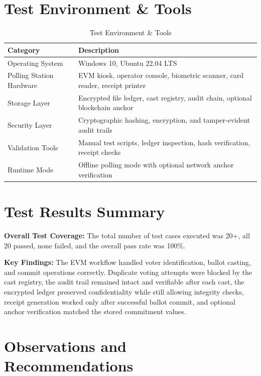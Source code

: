 \section{Test Environment \& Tools}

\begin{table}[htbp]
\centering
\caption{Test Environment \& Tools}
\begin{tabular}{p{}|p{}}
\toprule
\textbf{Category} & \textbf{Description} \\
\midrule
Operating System & Windows 10, Ubuntu 22.04 LTS \\
\midrule
Polling Station Hardware & EVM kiosk, operator console, biometric scanner, card reader, receipt printer \\
\midrule
Storage Layer & Encrypted file ledger, cast registry, audit chain, optional blockchain anchor \\
\midrule
Security Layer & Cryptographic hashing, encryption, and tamper-evident audit trails \\
\midrule
Validation Tools & Manual test scripts, ledger inspection, hash verification, receipt checks \\
\midrule
Runtime Mode & Offline polling mode with optional network anchor verification \\
\bottomrule
\end{tabular}
\end{table}

\section{Test Results Summary}

\textbf{Overall Test Coverage:}
The total number of test cases executed was 20+, all 20 passed, none failed, and the overall pass rate was 100\%.

\textbf{Key Findings:}
The EVM workflow handled voter identification, ballot casting, and commit operations correctly. Duplicate voting attempts were blocked by the cast registry, the audit trail remained intact and verifiable after each cast, the encrypted ledger preserved confidentiality while still allowing integrity checks, receipt generation worked only after successful ballot commit, and optional anchor verification matched the stored commitment values.

\section{Observations and Recommendations}

